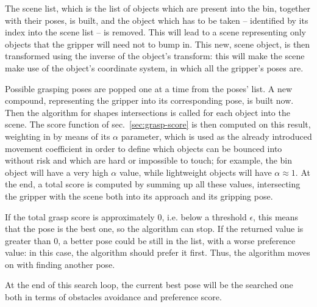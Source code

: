 The scene list, which is the list of objects which are present into
the bin, together with their poses, is built, and the object which has
to be taken -- identified by its index into the scene list -- is
removed. This will lead to a scene representing only objects that
the gripper will need not to bump in. This new, scene object, is then
transformed using the inverse of the object's transform: this will
make the scene make use of the object's coordinate system, in which
all the gripper's poses are.

Possible grasping poses are popped one at a time from the poses'
list. A new compound, representing the gripper into its corresponding
pose, is built now. Then the algorithm for shapes intersections is
called for each object into the scene. The score function of
sec.~\ref{sec:grasp-score} is then computed on this result,
weighting in by means of its $\alpha$ parameter, which is used as the
already introduced movement coefficient in order to define which
objects can be bounced into without risk and which are hard or
impossible to touch; for example, the bin object will have a very high
$\alpha$ value, while lightweight objects will have $\alpha \approx
1$. At the end, a total score is computed by summing up all these
values, intersecting the gripper with the scene both into its approach and its
gripping pose.

If the total grasp score is approximately 0, i.e. below a threshold $\epsilon$, this means that the pose is
the best one, so the algorithm can stop. If the returned value is
greater than 0, a better pose could be still in the list, with a worse
preference value: in this case, the algorithm should prefer it
first. Thus, the algorithm moves on with finding another pose.

At the end of this search loop, the current best pose will be the
searched one both in terms of obstacles avoidance  and preference
score. 

